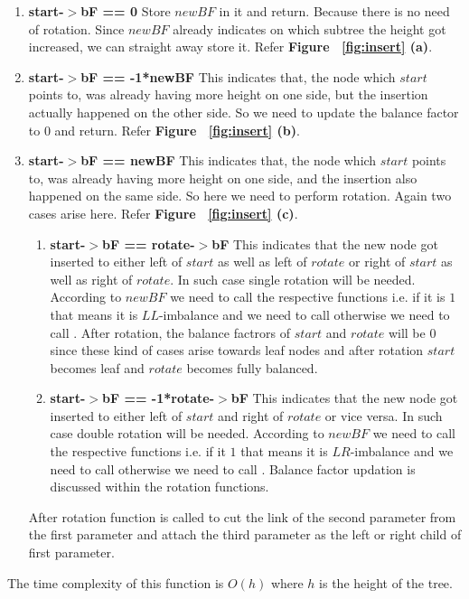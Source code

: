 \documentclass{article}
\begin{document}
\begin{enumerate}
\item \textbf{start-$>$bF == 0}\newline
Store $newBF$ in it and return. Because there is no need of rotation. Since $newBF$ already indicates on which subtree the height got increased, we can straight away store it. Refer \textbf{Figure ~\ref{fig:insert} (a)}.
\item \textbf{start-$>$bF == -1*newBF}\newline
This indicates that, the node which $start$ points to, was already having more height on one side, but the insertion actually happened on the other side. So we need to update the balance factor to 0 and return. Refer \textbf{Figure ~\ref{fig:insert} (b)}.
\item \textbf{start-$>$bF == newBF}\newline
This indicates that, the node which $start$ points to, was already having more height on one side, and the insertion also happened on the same side. So here we need to perform rotation. Again two cases arise here. Refer \textbf{Figure ~\ref{fig:insert} (c)}.
\begin{enumerate}
\item \textbf{start-$>$bF == rotate-$>$bF}\newline
This indicates that the new node got inserted to either left of $start$ as well as left of $rotate$ or right of $start$ as well as right of $rotate$. In such case single rotation will be needed. According to $newBF$ we need to call the respective functions i.e. if it is $1$ that means it is $LL$-imbalance and we need to call  otherwise we need to call . After rotation, the balance factrors of $start$ and $rotate$ will be $0$ since these kind of cases arise towards leaf nodes and after rotation $start$ becomes leaf and $rotate$ becomes fully balanced.
\item \textbf{start-$>$bF == -1*rotate-$>$bF}\newline
This indicates that the new node got inserted to either left of $start$ and right of $rotate$ or vice versa. In such case double rotation will be needed. According to $newBF$ we need to call the respective functions i.e. if it $1$ that means it is $LR$-imbalance and we need to call  otherwise we need to call . Balance factor updation is discussed within the rotation functions.
\end{enumerate}
After rotation  function is called to cut the link of the second parameter from the first parameter and attach the third parameter as the left or right child of first parameter.
\end{enumerate}
The time complexity of this function is $O(h)$ where $h$ is the height of the tree.
\end{document}
